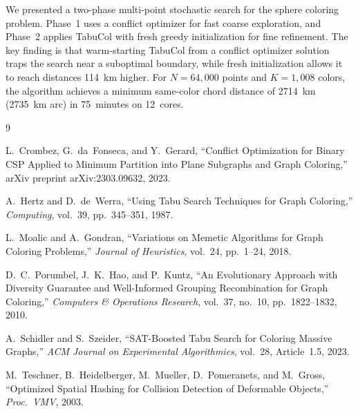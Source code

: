 \documentclass[11pt,a4paper]{article}
\begin{document}
We presented a two-phase multi-point stochastic search for the sphere coloring problem.
Phase~1 uses a conflict optimizer for fast coarse exploration, and Phase~2 applies TabuCol
with fresh greedy initialization for fine refinement. The key finding is that warm-starting
TabuCol from a conflict optimizer solution traps the search near a suboptimal boundary,
while fresh initialization allows it to reach distances 114~km higher. For $N = 64{,}000$
points and $K = 1{,}008$ colors, the algorithm achieves a minimum same-color chord distance
of 2714~km (2735~km arc) in 75~minutes on 12~cores.

\begin{thebibliography}{9}

L.~Crombez, G.~da~Fonseca, and Y.~Gerard,
``Conflict Optimization for Binary CSP Applied to Minimum Partition into Plane Subgraphs
and Graph Coloring,''
arXiv preprint arXiv:2303.09632, 2023.

A.~Hertz and D.~de~Werra,
``Using Tabu Search Techniques for Graph Coloring,''
\textit{Computing}, vol.~39, pp.~345--351, 1987.

L.~Moalic and A.~Gondran,
``Variations on Memetic Algorithms for Graph Coloring Problems,''
\textit{Journal of Heuristics}, vol.~24, pp.~1--24, 2018.

D.~C.~Porumbel, J.~K.~Hao, and P.~Kuntz,
``An Evolutionary Approach with Diversity Guarantee and Well-Informed Grouping
Recombination for Graph Coloring,''
\textit{Computers \& Operations Research}, vol.~37, no.~10, pp.~1822--1832, 2010.

A.~Schidler and S.~Szeider,
``SAT-Boosted Tabu Search for Coloring Massive Graphs,''
\textit{ACM Journal on Experimental Algorithmics}, vol.~28, Article~1.5, 2023.

M.~Teschner, B.~Heidelberger, M.~Mueller, D.~Pomeranets, and M.~Gross,
``Optimized Spatial Hashing for Collision Detection of Deformable Objects,''
\textit{Proc.\ VMV}, 2003.

\end{thebibliography}
\end{document}
